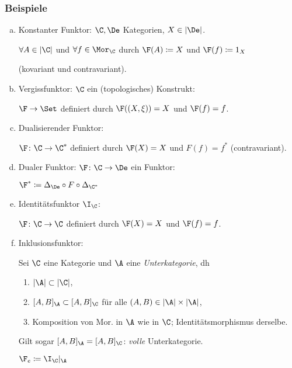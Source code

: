 \begin{frame}
  \frametitle{Beispiele}
  \begin{enumerate}[a)]
      \item<+-> Konstanter Funktor:
      $\C,\De$ Kategorien, $X \in |\De|$.

        $\forall A \in |\C|$ und $\forall f \in \Mor_\C$ durch $\F(A) \coloneqq X$ und $\F(f) \coloneqq 1_X$ 
        
        (kovariant und contravariant).
      \item<+-> Vergissfunktor: $\C$ ein (topologisches) Konstrukt: 
        
        $\F \to \Set$ definiert durch $\F((X, \xi)) = X$ und $\F(f) = f$.
      \item<+-> Dualisierender Funktor: 
        
        $\F \colon \C \to \C^*$ definiert durch $\F(X) = X$ und $F(f) = f^*$ (contravariant).
      \item<+-> Dualer Funktor: $\F \colon \C \to \De$ ein Funktor: 
        
        $\F^* \coloneqq \Delta_{\De} \circ F \circ \Delta_{\C^*}$
        
      \item<+-> Identitätsfunktor $\I_\C$: 
        
        $\F \colon \C \to \C$ definiert durch $\F(X) = X$ und $\F(f) = f$.

      \item<+-> Inklusionsfunktor: 
        
        Sei $\C$ eine Kategorie und $\A$ eine \emph{Unterkategorie}, dh 
        \begin{enumerate}[1.]
          \item $|\A| \subset |\C|$,
          \item $[A, B]_\A \subset [A,B]_\C$ für alle $(A, B) \in |\A| \times |\A|$,
          \item Komposition von Mor. in $\A$ wie in $\C$; Identitätsmorphismus derselbe.
        \end{enumerate}
        Gilt sogar $[A, B]_\A = [A, B]_\C$: \emph{volle} Unterkategorie.

        $\F_e \coloneqq \I_\C |_\A$
    \end{enumerate}
\end{frame}

